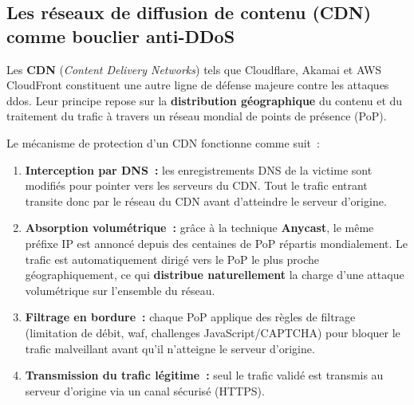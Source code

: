\subsection{Les réseaux de diffusion de contenu (CDN) comme bouclier anti-DDoS}

Les \textbf{CDN} (\textit{Content Delivery Networks}) tels que Cloudflare, Akamai et AWS CloudFront constituent une autre ligne de défense majeure contre les attaques \gls{ddos}. Leur principe repose sur la \textbf{distribution géographique} du contenu et du traitement du trafic à travers un réseau mondial de points de présence (PoP).

Le mécanisme de protection d'un CDN fonctionne comme suit~:
\begin{enumerate}
    \item \textbf{Interception par DNS~:} les enregistrements DNS de la victime sont modifiés pour pointer vers les serveurs du CDN. Tout le trafic entrant transite donc par le réseau du CDN avant d'atteindre le serveur d'origine.
    \item \textbf{Absorption volumétrique~:} grâce à la technique \textbf{Anycast}, le même préfixe IP est annoncé depuis des centaines de PoP répartis mondialement. Le trafic est automatiquement dirigé vers le PoP le plus proche géographiquement, ce qui \textbf{distribue naturellement} la charge d'une attaque volumétrique sur l'ensemble du réseau.
    \item \textbf{Filtrage en bordure~:} chaque PoP applique des règles de filtrage (limitation de débit, \gls{waf}, challenges JavaScript/CAPTCHA) pour bloquer le trafic malveillant avant qu'il n'atteigne le serveur d'origine.
    \item \textbf{Transmission du trafic légitime~:} seul le trafic validé est transmis au serveur d'origine via un canal sécurisé (HTTPS).
\end{enumerate}


